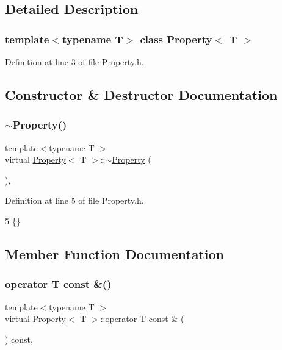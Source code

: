 \subsection{Detailed Description}
\subsubsection*{template$<$typename T$>$\newline
class Property$<$ T $>$}



Definition at line 3 of file Property.\+h.



\subsection{Constructor \& Destructor Documentation}
\mbox{\label{classProperty_a07aa35ff914a89ddfa870beb39ed2282}} 
\subsubsection{\texorpdfstring{$\sim$\+Property()}{~Property()}}
{\footnotesize\ttfamily template$<$typename T $>$ \\
virtual \mbox{\hyperlink{classProperty}{Property}}$<$ T $>$\+::$\sim$\mbox{\hyperlink{classProperty}{Property}} (\begin{DoxyParamCaption}{ }\end{DoxyParamCaption})\hspace{0.3cm}{\ttfamily [inline]}, {\ttfamily [virtual]}}



Definition at line 5 of file Property.\+h.


\begin{DoxyCode}
5 \{\}
\end{DoxyCode}


\subsection{Member Function Documentation}
\mbox{\label{classProperty_ac6e42e7bc8389563c1a146ada975537d}} 
\subsubsection{\texorpdfstring{operator T const \&()}{operator T const \&()}}
{\footnotesize\ttfamily template$<$typename T $>$ \\
virtual \mbox{\hyperlink{classProperty}{Property}}$<$ T $>$\+::operator T const \& (\begin{DoxyParamCaption}{ }\end{DoxyParamCaption}) const\hspace{0.3cm}{\ttfamily [inline]}, {\ttfamily [virtual]}}



